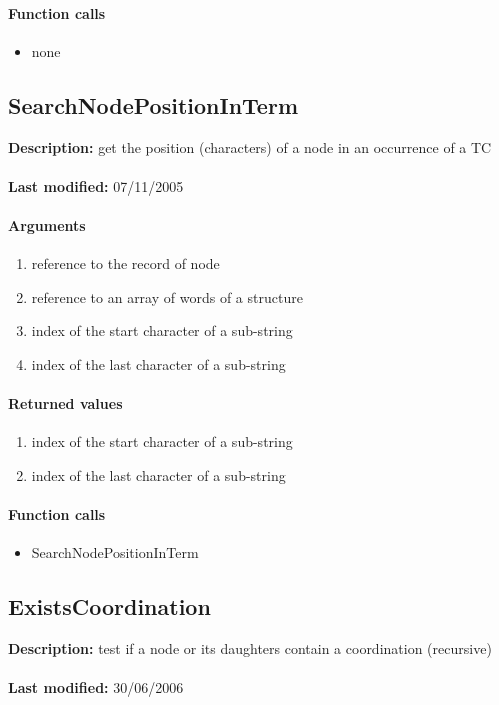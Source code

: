 \paragraph{Function calls}
\begin{itemize}
\item none
\end{itemize}

\subsection{SearchNodePositionInTerm}
\textbf{Description:} get the position (characters) of a node in an occurrence of a TC\\
\\\textbf{Last modified:} 07/11/2005

\paragraph{Arguments}
\begin{enumerate}
\item reference to the record of node
\item reference to an array of words of a structure
\item index of the start character of a sub-string
\item index of the last character of a sub-string
\end{enumerate}

\paragraph{Returned values}
\begin{enumerate}
\item index of the start character of a sub-string
\item index of the last character of a sub-string
\end{enumerate}

\paragraph{Function calls}
\begin{itemize}
\item SearchNodePositionInTerm
\end{itemize}

\subsection{ExistsCoordination}
\textbf{Description:} test if a node or its daughters contain a coordination (recursive)\\
\\\textbf{Last modified:} 30/06/2006

